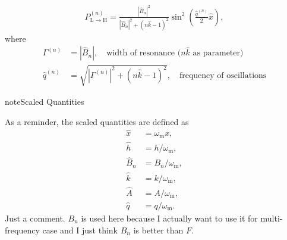 \documentclass[letterpaper,12pt,english]{sphinxmanual}
\begin{document}
\begin{equation*}
\begin{split}P_{\mathrm{L}\to\mathrm{H}}^{(n)} = \frac{ \left\lvert \hat B_{n}  \right\rvert^2 }{ \left\lvert   \hat B_{n}  \right\rvert^2 + ( n \hat k - 1 )^2  } \sin^2 \left( \frac{ \hat q^{(n)} }{2} \hat x \right),\end{split}
\end{equation*}
where
\begin{equation*}
\begin{split}\Gamma^{(n)} &= \left\lvert \hat B_{n} \right\rvert, \quad \text{width of resonance ($n\hat k$ as parameter)} \\
\hat q^{(n)} &= \sqrt{\left\lvert  \Gamma^{(n)} \right\rvert^2 + ( n \hat k - 1 )^2},\quad \text{frequency of oscillations}\end{split}
\end{equation*}
\begin{sphinxadmonition}{note}{Scaled Quantities}

As a reminder, the scaled quantities are defined as
\begin{equation*}
\begin{split}\hat x &= \omega_{\mathrm{m}} x, \\
\hat h &= h/\omega_{\mathrm{m}}, \\
\hat B_n &= B_n/\omega_{\mathrm{m}}, \\
\hat k &= k/\omega_{\mathrm{m}}, \\
\hat A &= A/\omega_{\mathrm{m}}, \\
\hat q &= q/\omega_{\mathrm{m}} .\end{split}
\end{equation*}
Just a comment. \(B_n\) is used here because I actually want to use it for multi-frequency case and I just think \(B_n\) is better than \(F\).
\end{sphinxadmonition}
\end{document}
